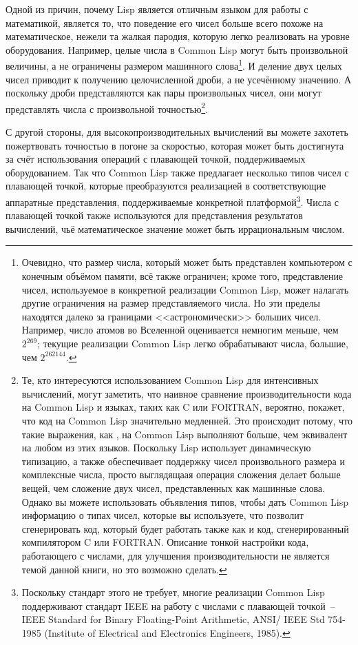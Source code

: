 Одной из причин, почему Lisp является отличным языком для работы с математикой, является
то, что поведение его чисел больше всего похоже на математическое, нежели та жалкая
пародия, которую легко реализовать на уровне оборудования.  Например, целые числа в Common
Lisp могут быть произвольной величины, а не ограничены размером машинного
слова\footnote{Очевидно, что размер числа, который может быть представлен компьютером с
  конечным объёмом памяти, всё также ограничен; кроме того, представление чисел,
  используемое в конкретной реализации Common Lisp, может налагать другие ограничения на
  размер представляемого числа.  Но эти пределы находятся далеко за границами
  <<астрономически>> больших чисел.  Например, число атомов во Вселенной оценивается
  немногим меньше, чем $2^{269}$; текущие реализации Common Lisp легко обрабатывают числа,
  большие, чем $2^{262144}$.}.  И деление двух целых чисел приводит к получению
целочисленной дроби, а не усечённому значению.  А поскольку дроби представляются как пары
произвольных чисел, они могут представлять числа с произвольной точностью\footnote{Те,
  кто интересуются использованием Common Lisp для интенсивных вычислений, могут заметить,
  что наивное сравнение производительности кода на Common Lisp и языках, таких как C или
  FORTRAN, вероятно, покажет, что код на Common Lisp значительно медленней.  Это происходит
  потому, что такие выражения, как , на Common Lisp выполняют больше, чем
  эквивалент  на любом из этих языков.  Поскольку Lisp использует динамическую
  типизацию, а также обеспечивает поддержку чисел произвольного размера и комплексные
  числа, просто выглядящаая операция сложения делает больше вещей, чем сложение двух
  чисел, представленных как машинные слова.  Однако вы можете использовать объявления
  типов, чтобы дать Common Lisp информацию о типах чисел, которые вы используете, что
  позволит сгенерировать код, который будет работать также как и код, сгенерированный
  компилятором C или FORTRAN.  Описание тонкой настройки кода, работающего с числами, для
  улучшения производительности не является темой данной книги, но это возможно сделать.}.

С другой стороны, для высокопроизводительных вычислений вы можете захотеть пожертвовать
точностью в погоне за скоростью, которая может быть достигнута за счёт использования
операций с плавающей точкой, поддерживаемых оборудованием.  Так что Common Lisp также
предлагает несколько типов чисел с плавающей точкой, которые преобразуются реализацией в
соответствующие аппаратные представления, поддерживаемые конкретной
платформой\footnote{Поскольку стандарт этого не требует, многие реализации Common Lisp
  поддерживают стандарт IEEE на работу с числами с плавающей точкой~-- IEEE Standard for
  Binary Floating-Point Arithmetic, ANSI/ IEEE Std 754-1985 (Institute of Electrical and
  Electronics Engineers, 1985).}.  Числа с плавающей точкой также используются для
представления результатов вычислений, чьё математическое значение может быть
иррациональным числом.

